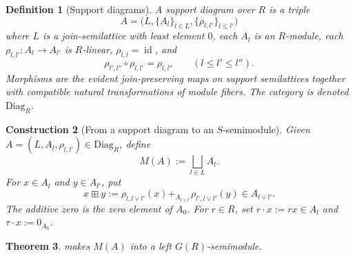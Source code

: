 \documentclass[11pt]{article}
\newcommand{\id}{\operatorname{id}}
\newcommand{\1}{\mathbf 1}
\newcommand{\Diag}{\mathrm{Diag}}
\newtheorem{theorem}{Theorem}[section]
\newtheorem{definition}[theorem]{Definition}
\newtheorem{construction}[theorem]{Construction}
\numberwithin{equation}{section}
\begin{document}
\begin{definition}[Support diagrams]\label{def:support-diagram}
A support diagram over $R$ is a triple
\begin{equation}
  A=\bigl(L,\{A_l\}_{l\in L},\{\rho_{l,l'}\}_{l\le l'}\bigr)
\end{equation}
where $L$ is a join-semilattice with least element $0$, each $A_l$ is an $R$-module, each $\rho_{l,l'}:A_l\to A_{l'}$ is $R$-linear, $\rho_{l,l}=\id$, and
\begin{equation}
  \rho_{l',l''}\circ\rho_{l,l'}=\rho_{l,l''}
  \qquad(l\le l'\le l'').
\end{equation}
Morphisms are the evident join-preserving maps on support semilattices together with compatible natural transformations of module fibers.  The category is denoted $\Diag_R$.
\end{definition}

\begin{construction}[From a support diagram to an $S$-semimodule]\label{constr:diagram-to-module}
Given $A=(L,A_l,\rho_{l,l'})\in\Diag_R$, define
\begin{equation}
  M(A):=\bigsqcup_{l\in L}A_l.
\end{equation}
For $x\in A_l$ and $y\in A_{l'}$, put
\begin{equation}\label{eq:diagram-addition}
  x\boxplus y:=\rho_{l,l\vee l'}(x)+_{A_{l\vee l'}}\rho_{l',l\vee l'}(y)
  \in A_{l\vee l'}.
\end{equation}
The additive zero is the zero element of $A_0$.  For $r\in R$, set $r\cdot x:=rx\in A_l$ and $\tau\cdot x:=0_{A_0}$.
\end{construction}

\begin{theorem}\label{thm:diagram-module}
 makes $M(A)$ into a left $G(R)$-semimodule.
\end{theorem}
\end{document}
